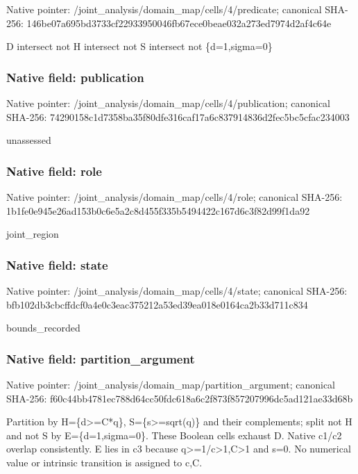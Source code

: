 \documentclass[10pt,a4paper]{article}
\begin{document}
Native pointer: /joint\_analysis/domain\_m\allowbreak{}ap/cells/4/predicate; canonical SHA-256: 146be07a695bd3733cf22933\allowbreak{}950046fb67ece0beae032a27\allowbreak{}3ed7974d2af4c64e


D intersect not H intersect not S intersect not \{d=1,sigma=0\}


\subsubsection{Native field: publication}


Native pointer: /joint\_analysis/domain\_m\allowbreak{}ap/cells/4/publication; canonical SHA-256: 74290158c1d7358ba35f80df\allowbreak{}e316caf17a6c837914836d2f\allowbreak{}ec5bc5cfac234003


unassessed


\subsubsection{Native field: role}


Native pointer: /joint\_analysis/domain\_map/cells/4/role; canonical SHA-256: 1b1fe0e945e26ad153b0c6e5\allowbreak{}a2c8d455f335b5494422c167\allowbreak{}d6c3f82d99f1da92


joint\_region


\subsubsection{Native field: state}


Native pointer: /joint\_analysis/domain\_m\allowbreak{}ap/cells/4/state; canonical SHA-256: bfb102db3cbcffdcf0a4e0c3\allowbreak{}eac375212a53ed39ea018e01\allowbreak{}64ca2b33d711c834


bounds\_recorded


\subsubsection{Native field: partition\_argument}


Native pointer: /joint\_analysis/domain\_m\allowbreak{}ap/partition\_argument; canonical SHA-256: f60c44bb4781ec788d64cc50\allowbreak{}fdc618a6c2f873f857207996\allowbreak{}dc5ad121ae33d68b


Partition by H=\{d>=C*q\}, S=\{s>=sqrt(q)\} and their complements; split not H and not S by E=\{d=1,sigma=0\}. These Boolean cells exhaust D. Native c1/c2 overlap consistently. E lies in c3 because q>=1/c>1,C>1 and s=0. No numerical value or intrinsic transition is assigned to c,C.
\end{document}
